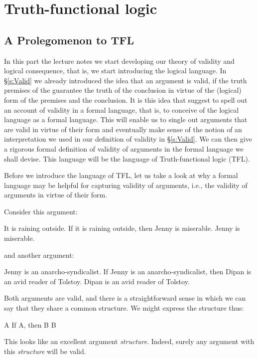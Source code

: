 \part{Truth-functional logic}
\label{ch.TFL}

\chapter{A Prolegomenon to TFL}
In this part the lecture notes we start developing our theory of validity and logical consequence, that is, we start introducing the logical language. In \S\ref{s:Valid} we already introduced the idea that an argument is valid, if the truth premises of the guarantee the truth of the conclusion in virtue of the (logical) form of the premises and the conclusion. It is this idea that suggest to spell out an account of validity in a formal language, that is, to conceive of the logical language as a formal language. This will enable us to single out arguments that are valid in virtue of their form and eventually make sense of the notion of an interpretation we used in our definition of validity in \S\ref{s:Valid}. We can then give a rigorous formal definition of validity of arguments in the formal language we shall devise. This language will be the language of Truth-functional logic (TFL).

Before we introduce the language of TFL, let us take a look at why a formal language may be helpful for capturing validity of arguments, i.e., the validity of arguments in virtue of their form.

Consider this argument:
	\begin{earg}
		\prem It is raining outside.
		\prem If it is raining outside, then Jenny is miserable.
		\conc Jenny is miserable.
	\end{earg}
and another argument:
	\begin{earg}
		\prem Jenny is an anarcho-syndicalist.
		\prem If Jenny is an anarcho-syndicalist, then Dipan is an avid reader of Tolstoy.
		\conc Dipan is an avid reader of Tolstoy.
	\end{earg}
Both arguments are valid, and there is a straightforward sense in which we can say that they share a common structure. We might express the structure thus:
	\begin{earg}
		\prem A
		\prem If A, then B
		\conc B
	\end{earg}
This looks like an excellent argument \emph{structure}. Indeed, surely any argument with this \emph{structure} will be valid.

